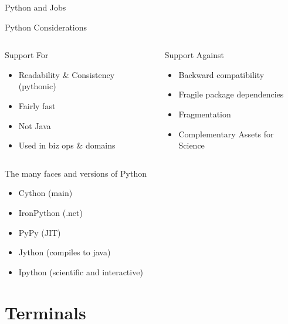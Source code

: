 \documentclass[presentation]{beamer}
\begin{document}
\begin{frame}[label=sec-2-3]{Python and Jobs}
\end{frame}

\begin{frame}[label=sec-2-4]{Python Considerations}
\begin{columns}
\begin{column}{0.5\textwidth}
\begin{block}{Support For}
\begin{itemize}
\item Readability \& Consistency (pythonic)
\item Fairly fast
\item Not Java
\item Used in biz ops \& domains
\end{itemize}
\end{block}
\end{column}
\begin{column}{0.5\textwidth}
\begin{block}{Support Against}
\begin{itemize}
\item Backward compatibility
\item Fragile package dependencies
\item Fragmentation
\item Complementary Assets for Science
\end{itemize}
\end{block}
\end{column}
\end{columns}
\end{frame}
\begin{frame}[label=sec-2-5]{The many faces and versions of Python}
\begin{itemize}
\item Cython (main)
\item IronPython (.net)
\item PyPy (JIT)
\item Jython (compiles to java)
\item Ipython (scientific and interactive)
\end{itemize}
\end{frame}
\section{Terminals}
\label{sec-3}
\end{document}
